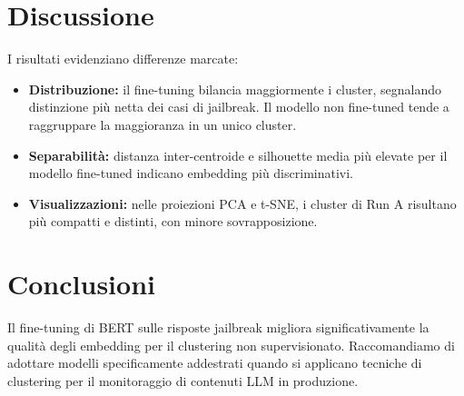 \documentclass[a4paper,12pt]{article}
\begin{document}
\FloatBarrier

\section{Discussione}
I risultati evidenziano differenze marcate:
\begin{itemize}
  \item \textbf{Distribuzione:} il fine-tuning bilancia maggiormente i cluster, segnalando distinzione più netta dei casi di jailbreak. Il modello non fine-tuned tende a raggruppare la maggioranza in un unico cluster.
  \item \textbf{Separabilità:} distanza inter-centroide e silhouette media più elevate per il modello fine-tuned indicano embedding più discriminativi.
  \item \textbf{Visualizzazioni:} nelle proiezioni PCA e t-SNE, i cluster di Run A risultano più compatti e distinti, con minore sovrapposizione.
\end{itemize}

\section{Conclusioni}
Il fine-tuning di BERT sulle risposte jailbreak migliora significativamente la qualità degli embedding per il clustering non supervisionato. Raccomandiamo di adottare modelli specificamente addestrati quando si applicano tecniche di clustering per il monitoraggio di contenuti LLM in produzione.
\end{document}
